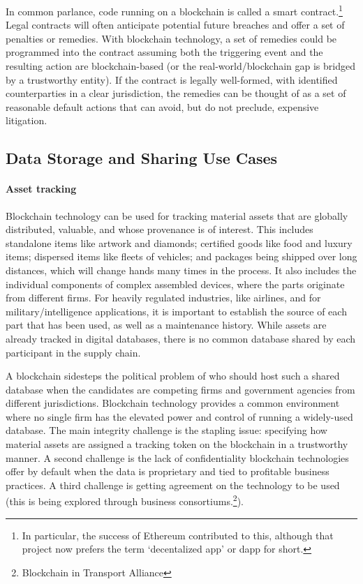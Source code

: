 In common parlance, code running on a blockchain is called a smart contract.\footnote{In particular, the success of Ethereum contributed to this, although that project now prefers the term `decentalized app' or dapp for short.} Legal contracts will often anticipate potential future breaches and offer a set of penalties or remedies.
With blockchain technology, a set of remedies could be programmed into the contract assuming both the triggering event and the resulting action are blockchain-based (or the real-world/blockchain gap is bridged by a trustworthy entity).
If the contract is legally well-formed, with identified counterparties in a clear jurisdiction, the remedies can be thought of as a set of reasonable default actions that can avoid, but do not preclude, expensive litigation. 


\subsection{Data Storage and Sharing Use Cases}

\paragraph{Asset tracking} 

Blockchain technology can be used for tracking material assets that are globally distributed, valuable, and whose provenance is of interest.
This includes standalone items like artwork and diamonds; certified goods like food and luxury items; dispersed items like fleets of vehicles; and packages being shipped over long distances, which will change hands many times in the process. 
It also includes the individual components of complex assembled devices, where the parts originate from different firms. 
For heavily regulated industries, like airlines, and for military/intelligence applications, it is important to establish the source of each part that has been used, as well as a maintenance history.
While assets are already tracked in digital databases, there is no common database shared by each participant in the supply chain.  

A blockchain sidesteps the political problem of who should host such a shared database when the candidates are competing firms and government agencies from different jurisdictions. 
Blockchain technology provides a common environment where no single firm has the elevated power and control of running a widely-used database. 
The main integrity challenge is the stapling issue: specifying how material assets are assigned a tracking token on the blockchain in a trustworthy manner. 
A second challenge is the lack of confidentiality blockchain technologies offer by default  when the data is proprietary and tied to profitable business practices.
A third challenge is getting agreement on the technology to be used (this is being explored through business consortiums.\footnote{\eg Blockchain in Transport Alliance}).

